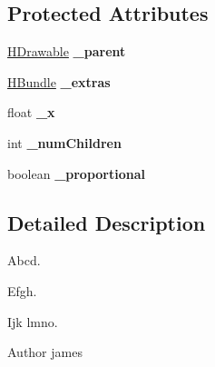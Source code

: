 \subsection*{Protected Attributes}
\begin{DoxyCompactItemize}
\item 
\hypertarget{classhype_1_1drawable_1_1_h_drawable_a1f95d00444c6964efa4239ddf135a10e}{\hyperlink{classhype_1_1drawable_1_1_h_drawable}{H\-Drawable} {\bfseries \-\_\-parent}}\label{classhype_1_1drawable_1_1_h_drawable_a1f95d00444c6964efa4239ddf135a10e}

\item 
\hypertarget{classhype_1_1drawable_1_1_h_drawable_a77a64d01b7766ad4d0e338f82ab23f12}{\hyperlink{classhype_1_1util_1_1_h_bundle}{H\-Bundle} {\bfseries \-\_\-extras}}\label{classhype_1_1drawable_1_1_h_drawable_a77a64d01b7766ad4d0e338f82ab23f12}

\item 
\hypertarget{classhype_1_1drawable_1_1_h_drawable_a20c0ae16de46b74c903667ac2db1640a}{float {\bfseries \-\_\-x}}\label{classhype_1_1drawable_1_1_h_drawable_a20c0ae16de46b74c903667ac2db1640a}

\item 
\hypertarget{classhype_1_1drawable_1_1_h_drawable_a1e2205f639598af5f419b82ae5bdc0cf}{int {\bfseries \-\_\-num\-Children}}\label{classhype_1_1drawable_1_1_h_drawable_a1e2205f639598af5f419b82ae5bdc0cf}

\item 
\hypertarget{classhype_1_1drawable_1_1_h_drawable_a7f9bb1ed841a8c8fe52e351ee3bf5844}{boolean {\bfseries \-\_\-proportional}}\label{classhype_1_1drawable_1_1_h_drawable_a7f9bb1ed841a8c8fe52e351ee3bf5844}

\end{DoxyCompactItemize}


\subsection{Detailed Description}
Abcd. 

Efgh.

Ijk lmno.

\begin{DoxyAuthor}{Author}
james 
\end{DoxyAuthor}



